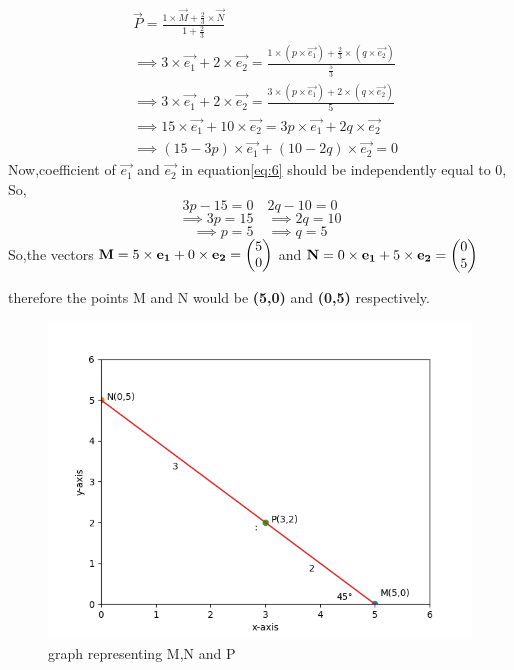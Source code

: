 \documentclass[journal,12pt,twocolumn]{IEEEtran}
\begin{document}
\begin{align}
    &\vec{P}=\frac{1\times \vec{M}+\frac{2}{3}\times \vec{N}}{1+\frac{2}{3}}\\
    &\implies  3\times\vec{e_1}+2\times\vec{e_2} =\frac{1\times (p\times \vec{e_1})+\frac{2}{3}\times (q\times\vec{e_2})}{\frac{5}{3}}\\
   &\implies 3\times\vec{e_1}+2\times\vec{e_2}=\frac{3\times (p\times\vec{e_1})+2\times (q\times\vec{e_2})}{5}\\
  &\implies 15\times\vec{e_1}+10\times\vec{e_2}=3p\times\vec{e_1}+2q\times\vec{e_2}\\
\label{eq:6}
 &\implies (15-3p)\times \vec{e_1}+(10-2q)\times\vec{e_2}=0
\end{align}
Now,coefficient of $\vec{e_1}$ and $\vec{e_2}$ in equation\eqref{eq:6} should be independently equal to 0,
So,
\begin{equation*}
3p-15=0\quad 2q-10=0
\end{equation*}
\begin{equation*}
 \implies3p=15\quad  \implies2q=10
\end{equation*}
\begin{equation}
 \implies p=5\quad \implies q=5      
\end{equation}
So,the vectors $\mathbf{M}=5\times\mathbf{e_1}+0\times\mathbf{e_2}=\begin{pmatrix}5\\0\end{pmatrix}$ and $ \mathbf{N}=0\times\mathbf{e_1}+5\times\mathbf{e_2}=\begin{pmatrix}0\\5\end{pmatrix}$ 
 
therefore the points M and N would be \textbf{(5,0)} and \textbf{(0,5)} respectively.
\begin{figure}[htb!]
\centering
\includegraphics{figures/Figure_1.png}
\caption{graph representing M,N and P}
\end{figure}
\end{document}
